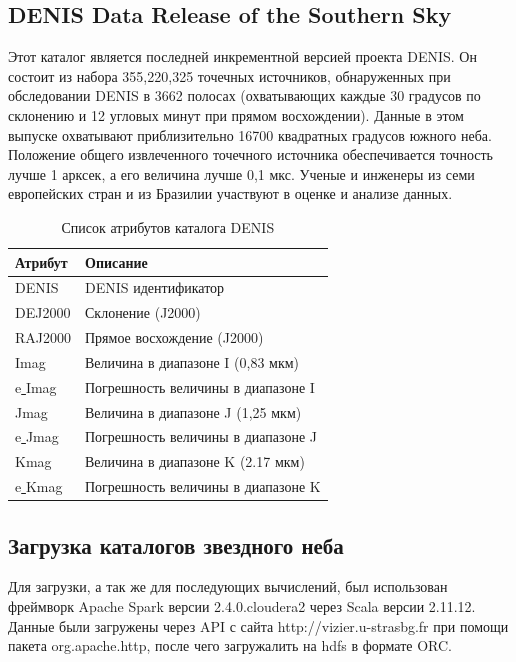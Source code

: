 \documentclass[12pt, a4paper]{article}
\begin{document}
	\subsection*{DENIS Data Release of the Southern Sky}
	Этот каталог является последней инкрементной версией проекта DENIS. Он состоит из набора 355,220,325 точечных источников, обнаруженных при обследовании DENIS в 3662 полосах (охватывающих каждые 30 градусов по склонению и 12 угловых минут при прямом восхождении). Данные в этом выпуске охватывают приблизительно 16700 квадратных градусов южного неба. Положение общего извлеченного точечного источника обеспечивается точность лучше 1 арксек, а его величина лучше 0,1 мкс. Ученые и инженеры из семи европейских стран и из Бразилии участвуют в оценке и анализе данных.
	\newline
	\begin{table}[h]
	\centering
	\begin{tabular}{|l|l|}
	\hline
	Атрибут & Описание \\ \hline
	DENIS & DENIS идентификатор \\ \hline
	DEJ2000 & Склонение (J2000) \\ \hline
	RAJ2000 & Прямое восхождение (J2000) \\ \hline
	Imag & Величина в диапазоне I (0,83 мкм)\\ \hline
	e\underline{ }Imag & Погрешность величины в диапазоне I\\ \hline
	Jmag & Величина в диапазоне J (1,25 мкм) \\ \hline
	e\underline{ }Jmag & Погрешность величины в диапазоне J\\ \hline
	Kmag & Величина в диапазоне K (2.17 мкм)\\ \hline
	e\underline{ }Kmag & Погрешность величины в диапазоне K\\ \hline
	\end{tabular}
	\caption{Список атрибутов каталога DENIS}
	\end{table}
	\subsection*{Загрузка каталогов звездного неба}
	Для загрузки, а так же для последующих вычислений, был использован фреймворк Apache Spark версии 2.4.0.cloudera2 через Scala версии 2.11.12. Данные были загружены через API с сайта http://vizier.u-strasbg.fr при помощи пакета org.apache.http, после чего загружалить на hdfs в формате ORC.
\end{document}
